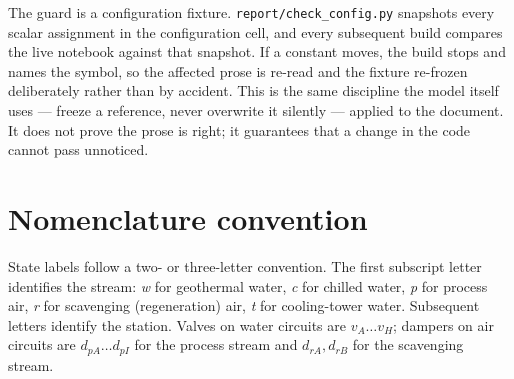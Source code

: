 \documentclass[11pt]{article}
\begin{document}
The guard is a configuration fixture. \verb|report/check_config.py| snapshots
every scalar assignment in the configuration cell, and every subsequent build
compares the live notebook against that snapshot. If a constant moves, the
build stops and names the symbol, so the affected prose is re-read and the
fixture re-frozen deliberately rather than by accident. This is the same
discipline the model itself uses --- freeze a reference, never overwrite it
silently --- applied to the document. It does not prove the prose is right; it
guarantees that a change in the code cannot pass unnoticed.

\section{Nomenclature convention}

State labels follow a two- or three-letter convention. The first subscript
letter identifies the stream: \emph{w} for geothermal water, \emph{c} for
chilled water, \emph{p} for process air, \emph{r} for scavenging
(regeneration) air, \emph{t} for cooling-tower water. Subsequent letters
identify the station. Valves on water circuits are $v_{A}\ldots v_{H}$;
dampers on air circuits are $d_{pA}\ldots d_{pI}$ for the process stream and
$d_{rA}, d_{rB}$ for the scavenging stream.
\end{document}
